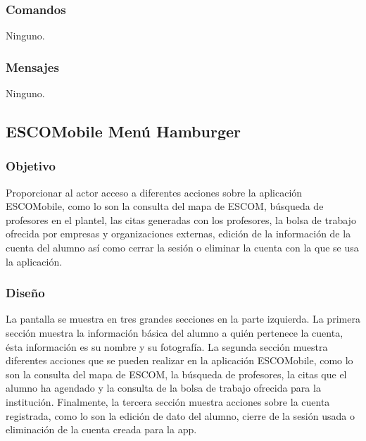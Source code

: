 \subsubsection{Comandos}
	\noindent
	Ninguno.

\subsubsection{Mensajes}
	\noindent
	Ninguno.




\subsection{ESCOMobile Menú Hamburger}

\subsubsection{Objetivo}
	\noindent
	Proporcionar al actor acceso a diferentes acciones sobre la aplicación ESCOMobile, como lo son la consulta del mapa de ESCOM, búsqueda de profesores en el plantel, las citas generadas con los profesores, la bolsa de trabajo ofrecida por empresas y organizaciones externas, edición de la información de la cuenta del alumno así como cerrar la sesión o eliminar la cuenta con la que se usa la aplicación.

\subsubsection{Diseño}
	\noindent
	La pantalla se muestra en tres grandes secciones en la parte izquierda. La primera sección muestra la información básica del alumno a quién pertenece la cuenta, ésta información es su nombre y su fotografía. La segunda sección muestra diferentes acciones que se pueden realizar en la aplicación ESCOMobile, como lo son la consulta del mapa de ESCOM, la búsqueda de profesores, la citas que el alumno ha agendado y la consulta de la bolsa de trabajo ofrecida para la institución. Finalmente, la tercera sección muestra acciones sobre la cuenta registrada, como lo son la edición de dato del alumno, cierre de la sesión usada o eliminación de la cuenta creada para la app. 

\pagebreak
{}

